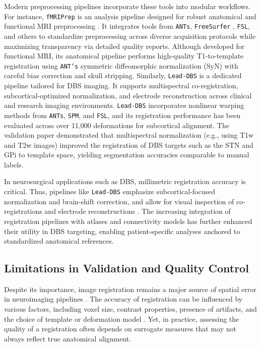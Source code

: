 Modern preprocessing pipelines incorporate these tools into modular workflows. For instance, \texttt{fMRIPrep} is an analysis pipeline designed for robust anatomical and functional MRI preprocessing \cite{Esteban2019-oz}. It integrates tools from \texttt{ANTs}, \texttt{FreeSurfer} \cite{Fischl2012-dp}, \texttt{FSL}, and others to standardize preprocessing across diverse acquisition protocols while maximizing transparency via detailed quality reports. Although developed for functional MRI, its anatomical pipeline performs high-quality T1-to-template registration using \texttt{ANT's} symmetric diffeomorphic normalization (SyN) with careful bias correction and skull stripping. Similarly, \texttt{Lead-DBS} is a dedicated pipeline tailored for DBS imaging. It supports multispectral co-registration, subcortical-optimized normalization, and electrode reconstruction across clinical and research imaging environments. \texttt{Lead-DBS} incorporates nonlinear warping methods from \texttt{ANTs}, \texttt{SPM}, and \texttt{FSL}, and its registration performance has been evaluated across over 11,000 deformations for subcortical alignment. The validation paper \cite{Ewert2019-cc} demonstrated that multispectral normalization (e.g., using T1w and T2w images) improved the registration of DBS targets such as the STN and GPi to template space, yielding segmentation accuracies comparable to manual labels. 

In neurosurgical applications such as DBS, millimetric registration accuracy is critical. Thus, pipelines like \texttt{Lead-DBS} emphasize subcortical-focused normalization and brain-shift correction, and allow for visual inspection of co-registrations and electrode reconstructions \cite{Neudorfer2023-wd}. The increasing integration of registration pipelines with atlases and connectivity models has further enhanced their utility in DBS targeting, enabling patient-specific analyses anchored to standardized anatomical references.

\subsection{Limitations in Validation and Quality Control}
Despite its importance, image registration remains a major source of spatial error in neuroimaging pipelines \cite{Lau2019-eh, Abbass2022-lf}. The accuracy of registration can be influenced by various factors, including voxel size, contrast properties, presence of artifacts, and the choice of template or deformation model \cite{Klein2009-lv, Ewert2019-cc}. Yet, in practice, assessing the quality of a registration often depends on surrogate measures that may not always reflect true anatomical alignment.

